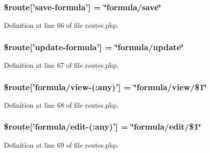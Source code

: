 \hypertarget{routes_8php_ac4025e680a101e2ed629e3c1c018a370}{
\subsubsection[{\$route}]{\setlength{\rightskip}{0pt plus 5cm}\$route\mbox{[}'save-\/formula'\mbox{]} = \char`\"{}formula/save\char`\"{}}}\label{routes_8php_ac4025e680a101e2ed629e3c1c018a370}


Definition at line 66 of file routes.\-php.

\hypertarget{routes_8php_a13c9451005d16325e799982e006991b4}{
\subsubsection[{\$route}]{\setlength{\rightskip}{0pt plus 5cm}\$route\mbox{[}'update-\/formula'\mbox{]} = \char`\"{}formula/update\char`\"{}}}\label{routes_8php_a13c9451005d16325e799982e006991b4}


Definition at line 67 of file routes.\-php.

\hypertarget{routes_8php_a602b5d83f6a0773216b78fecea4f64a9}{
\subsubsection[{\$route}]{\setlength{\rightskip}{0pt plus 5cm}\$route\mbox{[}'formula/view-\/(\-:any)'\mbox{]} = \char`\"{}formula/view/\$1\char`\"{}}}\label{routes_8php_a602b5d83f6a0773216b78fecea4f64a9}


Definition at line 68 of file routes.\-php.

\hypertarget{routes_8php_ae0cdd39125ebb94496dca4273c5e76ee}{
\subsubsection[{\$route}]{\setlength{\rightskip}{0pt plus 5cm}\$route\mbox{[}'formula/edit-\/(\-:any)'\mbox{]} = \char`\"{}formula/edit/\$1\char`\"{}}}\label{routes_8php_ae0cdd39125ebb94496dca4273c5e76ee}


Definition at line 69 of file routes.\-php.

